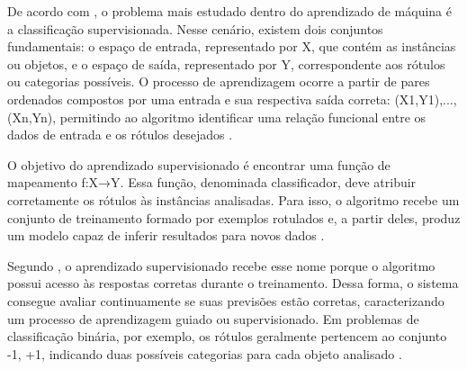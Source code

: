 \documentclass[
    12pt,                %
    openright,           %
    oneside,             %
    a4paper,             %
    english,             %
    brazil               %
]{abntex2}
\begin{document}
De acordo com , o problema mais estudado dentro do aprendizado de máquina é a classificação supervisionada. Nesse cenário, existem dois conjuntos fundamentais: o espaço de entrada, representado por X, que contém as instâncias ou objetos, e o espaço de saída, representado por Y, correspondente aos rótulos ou categorias possíveis. O processo de aprendizagem ocorre a partir de pares ordenados compostos por uma entrada e sua respectiva saída correta: (X1,Y1),...,(Xn,Yn), permitindo ao algoritmo identificar uma relação funcional entre os dados de entrada e os rótulos desejados \cite{Luxburg2008}.


O objetivo do aprendizado supervisionado é encontrar uma função de mapeamento f:X→Y. Essa função, denominada classificador, deve atribuir corretamente os rótulos às instâncias analisadas. Para isso, o algoritmo recebe um conjunto de treinamento formado por exemplos rotulados e, a partir deles, produz um modelo capaz de inferir resultados para novos dados \cite{Luxburg2008}.


Segundo , o aprendizado supervisionado recebe esse nome porque o algoritmo possui acesso às respostas corretas durante o treinamento. Dessa forma, o sistema consegue avaliar continuamente se suas previsões estão corretas, caracterizando um processo de aprendizagem guiado ou supervisionado. Em problemas de classificação binária, por exemplo, os rótulos geralmente pertencem ao conjunto {-1, +1}, indicando duas possíveis categorias para cada objeto analisado \cite{Luxburg2008}.
\end{document}
